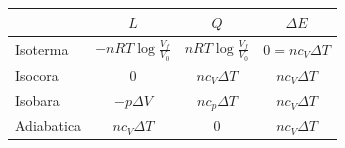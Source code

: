 \begin{figure}[htbp]
\centering
{}
\end{figure}

\begin{center}
\begin{tabular}{l|ccc}
&$L$&$Q$&$\Delta E$\\
\hline
Isoterma&$-nRT\log\frac{V_f}{V_0}$&$nRT\log\frac{V_f}{V_0}$&$0=nc_V\Delta T$\\
Isocora&$0$&$nc_V\Delta T$&$nc_V\Delta T$\\
Isobara&$-p\Delta V$&$nc_p\Delta T$&$nc_V\Delta T$\\
Adiabatica&$nc_V\Delta T$&$0$&$nc_V\Delta T$\\
\end{tabular}
\end{center}

